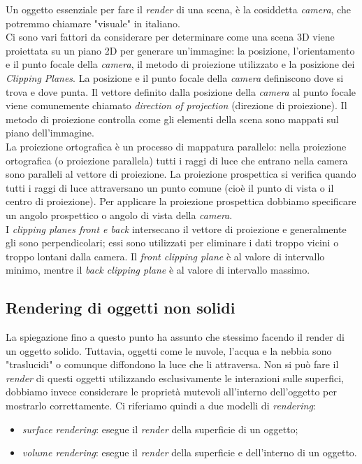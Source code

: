 Un oggetto essenziale per fare il \emph{render} di una scena, è la cosiddetta \emph{camera}, che potremmo chiamare "visuale" in italiano.
\\
Ci sono vari fattori da considerare per determinare come una scena 3D viene proiettata su un piano 2D per generare un'immagine: la posizione, l'orientamento e il punto focale della \emph{camera}, il metodo di proiezione utilizzato e la posizione dei \emph{Clipping Planes}. La posizione e il punto focale della \emph{camera} definiscono dove si trova e dove punta. Il vettore definito dalla posizione della \emph{camera} al punto focale viene comunemente chiamato \emph{direction of projection} (direzione di proiezione). Il metodo di proiezione controlla come gli elementi della scena sono mappati sul piano dell'immagine.
\\
La proiezione ortografica è un processo di mappatura parallelo: nella proiezione ortografica (o proiezione parallela) tutti i raggi di luce che entrano nella camera sono paralleli al vettore di proiezione. La proiezione prospettica si verifica quando tutti i raggi di luce attraversano un punto comune (cioè il punto di vista o il centro di proiezione). Per applicare la proiezione prospettica dobbiamo specificare un angolo prospettico o angolo di vista della \emph{camera}.
\\
I \emph{clipping planes front e back} intersecano il vettore di proiezione e generalmente gli sono perpendicolari; essi sono utilizzati per eliminare i dati troppo vicini o troppo lontani dalla camera. Il \emph{front clipping plane} è al valore di intervallo minimo, mentre il \emph{back clipping plane} è al valore di intervallo massimo.

\subsection{Rendering di oggetti non solidi}
La spiegazione fino a questo punto ha assunto che stessimo facendo il render di un oggetto solido. Tuttavia, oggetti come le nuvole, l'acqua e la nebbia sono "traslucidi" o comunque diffondono la luce che li attraversa. Non si può fare il \emph{render} di questi oggetti utilizzando esclusivamente le interazioni sulle superfici, dobbiamo invece considerare le proprietà mutevoli all'interno dell'oggetto per mostrarlo correttamente. Ci riferiamo quindi a due modelli di \emph{rendering}:
\begin{itemize}
\item \emph{surface rendering}: esegue il \emph{render} della superficie di un oggetto;
\item \emph{volume rendering}: esegue il \emph{render} della superficie e dell'interno di un oggetto.
\end{itemize}

